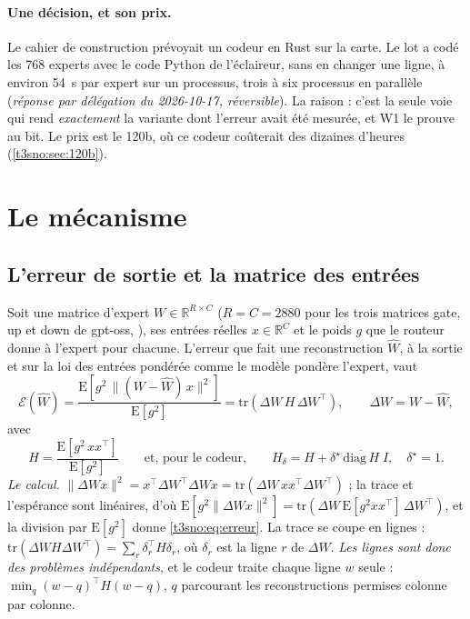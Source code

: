\paragraph{Une décision, et son prix.} Le cahier de construction prévoyait un codeur en Rust sur la carte. Le lot a codé les 768 experts avec le code Python de l'éclaireur, sans en changer une ligne, à environ \SI{54}{\second} par expert sur un processus, trois à six processus en parallèle (\emph{réponse par délégation du 2026-10-17, réversible}). La raison : c'est la seule voie qui rend \emph{exactement} la variante dont l'erreur avait été mesurée, et W1 le prouve au bit. Le prix est le 120b, où ce codeur coûterait des dizaines d'heures (\cref{t3sno:sec:120b}).

\section{Le mécanisme}\label{t3sno:sec:mecanisme}

\subsection{L'erreur de sortie et la matrice des entrées}\label{t3sno:sec:H}

Soit une matrice d'expert $W \in \mathbb{R}^{R \times C}$ ($R = C = \num{2880}$ pour les trois matrices gate, up et down de gpt-oss, \cite{openai2025gptoss}), ses entrées réelles $x \in \mathbb{R}^C$ et le poids $g$ que le routeur donne à l'expert pour chacune. L'erreur que fait une reconstruction $\hat W$, à la sortie et sur la loi des entrées pondérée comme le modèle pondère l'expert, vaut
\begin{equation}\label{t3sno:eq:erreur}
\mathcal{E}(\hat W) = \frac{\mathrm{E}\!\left[g^2 \,\lVert (W - \hat W)\, x \rVert^2\right]}{\mathrm{E}[g^2]}
= \mathrm{tr}\!\left(\Delta W \, H \, \Delta W^\top\right),
\qquad \Delta W = W - \hat W,
\end{equation}
avec
\begin{equation}\label{t3sno:eq:H}
H = \frac{\mathrm{E}[g^2\, x x^\top]}{\mathrm{E}[g^2]}
\qquad\text{et, pour le codeur,}\qquad
H_\delta = H + \delta^\star\, \overline{\mathrm{diag}\, H}\; I,\quad \delta^\star = 1 .
\end{equation}
\emph{Le calcul.} $\lVert \Delta W x\rVert^2 = x^\top \Delta W^\top \Delta W x = \mathrm{tr}(\Delta W\, x x^\top \Delta W^\top)$ ; la trace et l'espérance sont linéaires, d'où $\mathrm{E}[g^2 \lVert \Delta W x\rVert^2] = \mathrm{tr}(\Delta W\, \mathrm{E}[g^2 x x^\top]\, \Delta W^\top)$, et la division par $\mathrm{E}[g^2]$ donne \eqref{t3sno:eq:erreur}. La trace se coupe en lignes : $\mathrm{tr}(\Delta W H \Delta W^\top) = \sum_r \delta_r^\top H \delta_r$, où $\delta_r$ est la ligne $r$ de $\Delta W$. \emph{Les lignes sont donc des problèmes indépendants}, et le codeur traite chaque ligne $w$ seule : $\min_q (w - q)^\top H (w - q)$, $q$ parcourant les reconstructions permises colonne par colonne.

